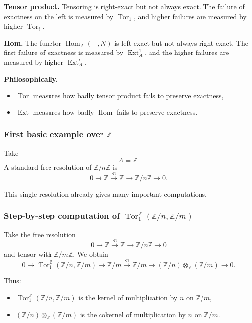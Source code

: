 \documentclass[12pt,a4paper]{article}
\theoremstyle{notespace}
\DeclareMathOperator{\Hom}{Hom}
\DeclareMathOperator{\Tor}{Tor}
\DeclareMathOperator{\Ext}{Ext}
\begin{document}
\textbf{Tensor product.}
Tensoring is right-exact but not always exact. The failure of exactness on the left is measured by \(\Tor_1\), and higher failures are measured by higher \(\Tor_i\).

\medskip

\textbf{Hom.}
The functor \(\Hom_A(-,N)\) is left-exact but not always right-exact. The first failure of exactness is measured by \(\Ext_A^1\), and the higher failures are measured by higher \(\Ext_A^i\).

\medskip

\textbf{Philosophically.}
\begin{itemize}
	\item \(\Tor\) measures how badly tensor product fails to preserve exactness,
	\item \(\Ext\) measures how badly \(\Hom\) fails to preserve exactness.
\end{itemize}

\subsubsection{First basic example over \(\mathbb Z\)}

Take
\[
A=\mathbb Z.
\]
A standard free resolution of \(\mathbb Z/n\mathbb Z\) is
\[
0\longrightarrow \mathbb Z \xrightarrow{\cdot n} \mathbb Z \longrightarrow \mathbb Z/n\mathbb Z \longrightarrow 0.
\]

This single resolution already gives many important computations.

\subsubsection{Step-by-step computation of \(\Tor_1^\mathbb Z(\mathbb Z/n,\mathbb Z/m)\)}

Take the free resolution
\[
0\longrightarrow \mathbb Z \xrightarrow{\cdot n} \mathbb Z \longrightarrow \mathbb Z/n\mathbb Z \longrightarrow 0
\]
and tensor with \(\mathbb Z/m\mathbb Z\). We obtain
\[
0\longrightarrow \Tor_1^\mathbb Z(\mathbb Z/n,\mathbb Z/m)
\longrightarrow \mathbb Z/m
\xrightarrow{\cdot n}
\mathbb Z/m
\longrightarrow (\mathbb Z/n)\otimes_\mathbb Z (\mathbb Z/m)
\longrightarrow 0.
\]

Thus:
\begin{itemize}
	\item \(\Tor_1^\mathbb Z(\mathbb Z/n,\mathbb Z/m)\) is the kernel of multiplication by \(n\) on \(\mathbb Z/m\),
	\item \((\mathbb Z/n)\otimes_\mathbb Z (\mathbb Z/m)\) is the cokernel of multiplication by \(n\) on \(\mathbb Z/m\).
\end{itemize}
\end{document}
